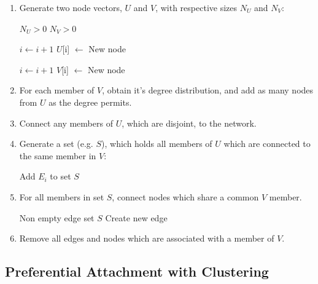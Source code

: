 \documentclass[a4paper,11pt,titlepage]{article}
\begin{document}
\begin{enumerate}
   \item
     Generate two node vectors, $U$ and $V$, with respective sizes $N_U$ and
     $N_V$:

     \begin{algorithmic}
       \REQUIRE $N_U > 0$
       \REQUIRE $N_V > 0$

	        \STATE $i \gets i + 1$
	        \STATE $U$[i] $\gets$ New node
       \ENDFOR

	       \STATE $i \gets i + 1$
	       \STATE $V$[i] $\gets$ New node
       \ENDFOR
     \end{algorithmic}

   \item
     For each member of $V$, obtain it's degree distribution, and add as many
     nodes from $U$ as the degree permits.

   \item
     Connect any members of $U$, which are disjoint, to the network.

   \item
     Generate a set (e.g. $S$), which holds all members of $U$
     which are connected to the same member in $V$:

     \begin{algorithmic}

		       \STATE Add $E_i$ to set $S$
	       \ENDIF
       \ENDFOR
     \end{algorithmic}

   \item
     For all members in set $S$, connect nodes which share a common
     $V$ member.

     \begin{algorithmic}
       \REQUIRE Non empty edge set $S$
			       \STATE Create new edge
		       \ENDIF
	       \ENDFOR
       \ENDFOR
     \end{algorithmic}

   \item
     Remove all edges and nodes which are associated with a member of $V$.

\end{enumerate}

\subsection{Preferential Attachment with Clustering}
\end{document}
